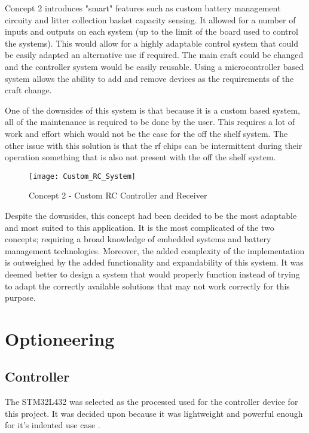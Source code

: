 \documentclass [11pt]{article}
\begin{document}
Concept 2 introduces "smart" features such as custom battery management circuity and litter collection basket capacity sensing. It allowed for a number of inputs and outputs on each system (up to the limit of the board used to control the systems). This would allow for a highly adaptable control system that could be easily adapted an alternative use if required. The main craft could be changed and the controller system would be easily reusable. Using a microcontroller based system allows the ability to add and remove devices as the requirements of the craft change.

One of the downsides of this system is that because it is a custom based system, all of the maintenance is required to be done by the user. This requires a lot of work and effort which would not be the case for the off the shelf system. The other issue with this solution is that the \gls{rf} chips can be intermittent during their operation something that is also not present with the off the shelf system.  

\begin{figure}[H]
\centerline{\texttt{[image: Custom\_RC\_System]}}
\caption{Concept 2 - Custom RC Controller and Receiver}
\label{fig:Custom_RC_System}
\end{figure} 

Despite the downsides, this concept had been decided to be the most adaptable and most suited to this application. It is the most complicated of the two concepts; requiring a broad knowledge of embedded systems and battery management technologies. Moreover, the added complexity of the implementation is outweighed by the added functionality and expandability of this system. It was deemed better to design a system that would properly function instead of trying to adapt the correctly available solutions that may not work correctly for this purpose.

\section{Optioneering}\label{sec:optioneering}
\subsection{Controller}

The STM32L432 was selected as the processed used for the controller device for this project. It was decided upon because it was lightweight and powerful enough for it's indented use case \cite{stm32l432KC}.
 
\end{document}
